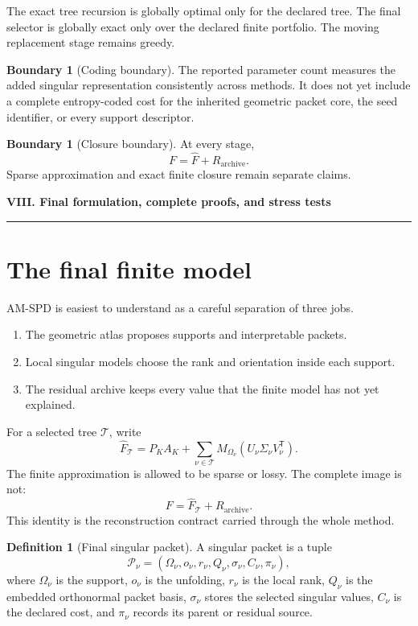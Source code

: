 \documentclass[11pt]{article}
\theoremstyle{definition}
\newtheorem{definition}[theorem]{Definition}
\newtheorem{boundary}[theorem]{Boundary}
\theoremstyle{remark}
\newcommand{\InlinePart}[1]{%
  \Needspace{15\baselineskip}%
  \vspace{1.5em}%
  {\color{Blue}\LARGE\bfseries #1\par}%
  \vspace{0.55em}%
  {\color{Blue}\rule{\linewidth}{1.1pt}}\par%
  \vspace{0.75em}%
}
\begin{document}
The exact tree recursion is globally optimal only for the declared tree. The final selector is globally exact only over the declared finite portfolio. The moving replacement stage remains greedy.

\begin{boundary}[Coding boundary]
The reported parameter count measures the added singular representation consistently across methods. It does not yet include a complete entropy-coded cost for the inherited geometric packet core, the seed identifier, or every support descriptor.
\end{boundary}

\begin{boundary}[Closure boundary]
At every stage,
\[
F=\widehat F+R_{\mathrm{archive}}.
\]
Sparse approximation and exact finite closure remain separate claims.
\end{boundary}

\InlinePart{VIII. Final formulation, complete proofs, and stress tests}

\section{The final finite model}
AM-SPD is easiest to understand as a careful separation of three jobs.

\begin{enumerate}
\item The geometric atlas proposes supports and interpretable packets.
\item Local singular models choose the rank and orientation inside each support.
\item The residual archive keeps every value that the finite model has not yet explained.
\end{enumerate}

For a selected tree $\mathcal T$, write
\[
\widehat F_{\mathcal T}
=
P_KA_K
+
\sum_{\nu\in\mathcal T}
M_{\Omega_\nu}
\left(
U_\nu\Sigma_\nu V_\nu^{\mathsf T}
\right).
\]
The finite approximation is allowed to be sparse or lossy. The complete image is not:
\[
\boxed{
F=\widehat F_{\mathcal T}+R_{\mathrm{archive}}.
}
\]
This identity is the reconstruction contract carried through the whole method.

\begin{definition}[Final singular packet]
A singular packet is a tuple
\[
\mathcal P_\nu
=
(\Omega_\nu,o_\nu,r_\nu,Q_\nu,\sigma_\nu,C_\nu,\pi_\nu),
\]
where $\Omega_\nu$ is the support, $o_\nu$ is the unfolding, $r_\nu$ is the local rank, $Q_\nu$ is the embedded orthonormal packet basis, $\sigma_\nu$ stores the selected singular values, $C_\nu$ is the declared cost, and $\pi_\nu$ records its parent or residual source.
\end{definition}
\end{document}
